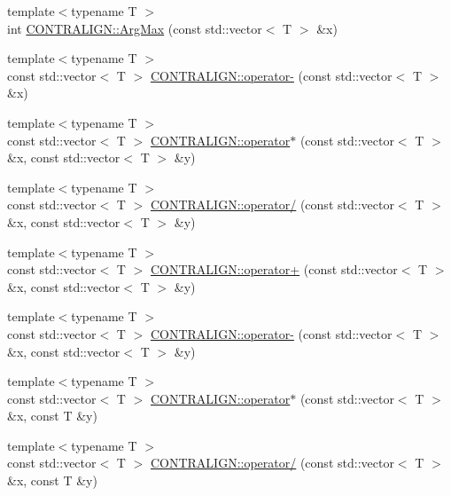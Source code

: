 \begin{DoxyCompactItemize}
\item 
{\footnotesize template$<$typename T $>$ }\\int \hyperlink{namespace_c_o_n_t_r_a_l_i_g_n_a00dc218b758ac62148b43b448dc0c1c2}{C\+O\+N\+T\+R\+A\+L\+I\+G\+N\+::\+Arg\+Max} (const std\+::vector$<$ T $>$ \&x)
\item 
{\footnotesize template$<$typename T $>$ }\\const std\+::vector$<$ T $>$ \hyperlink{namespace_c_o_n_t_r_a_l_i_g_n_a0dde76d72fb93b92bcf6bdcafbc435ba}{C\+O\+N\+T\+R\+A\+L\+I\+G\+N\+::operator-\/} (const std\+::vector$<$ T $>$ \&x)
\item 
{\footnotesize template$<$typename T $>$ }\\const std\+::vector$<$ T $>$ \hyperlink{namespace_c_o_n_t_r_a_l_i_g_n_af1b254c31a46ad2861442bb2390ee336}{C\+O\+N\+T\+R\+A\+L\+I\+G\+N\+::operator$\ast$} (const std\+::vector$<$ T $>$ \&x, const std\+::vector$<$ T $>$ \&y)
\item 
{\footnotesize template$<$typename T $>$ }\\const std\+::vector$<$ T $>$ \hyperlink{namespace_c_o_n_t_r_a_l_i_g_n_abe533e779b3a764b4b7dca6b627c1fed}{C\+O\+N\+T\+R\+A\+L\+I\+G\+N\+::operator/} (const std\+::vector$<$ T $>$ \&x, const std\+::vector$<$ T $>$ \&y)
\item 
{\footnotesize template$<$typename T $>$ }\\const std\+::vector$<$ T $>$ \hyperlink{namespace_c_o_n_t_r_a_l_i_g_n_ad37632aa6d04b0b0735dfe1a104a1010}{C\+O\+N\+T\+R\+A\+L\+I\+G\+N\+::operator+} (const std\+::vector$<$ T $>$ \&x, const std\+::vector$<$ T $>$ \&y)
\item 
{\footnotesize template$<$typename T $>$ }\\const std\+::vector$<$ T $>$ \hyperlink{namespace_c_o_n_t_r_a_l_i_g_n_a2a3a5dcf2fc4605559fa475cab65c6fe}{C\+O\+N\+T\+R\+A\+L\+I\+G\+N\+::operator-\/} (const std\+::vector$<$ T $>$ \&x, const std\+::vector$<$ T $>$ \&y)
\item 
{\footnotesize template$<$typename T $>$ }\\const std\+::vector$<$ T $>$ \hyperlink{namespace_c_o_n_t_r_a_l_i_g_n_ae2d8e5fded025a34e09c65c2dc997dd8}{C\+O\+N\+T\+R\+A\+L\+I\+G\+N\+::operator$\ast$} (const std\+::vector$<$ T $>$ \&x, const T \&y)
\item 
{\footnotesize template$<$typename T $>$ }\\const std\+::vector$<$ T $>$ \hyperlink{namespace_c_o_n_t_r_a_l_i_g_n_a2dca0d21c43b77c6ea3f790feb7ec634}{C\+O\+N\+T\+R\+A\+L\+I\+G\+N\+::operator/} (const std\+::vector$<$ T $>$ \&x, const T \&y)

\end{DoxyCompactItemize}
